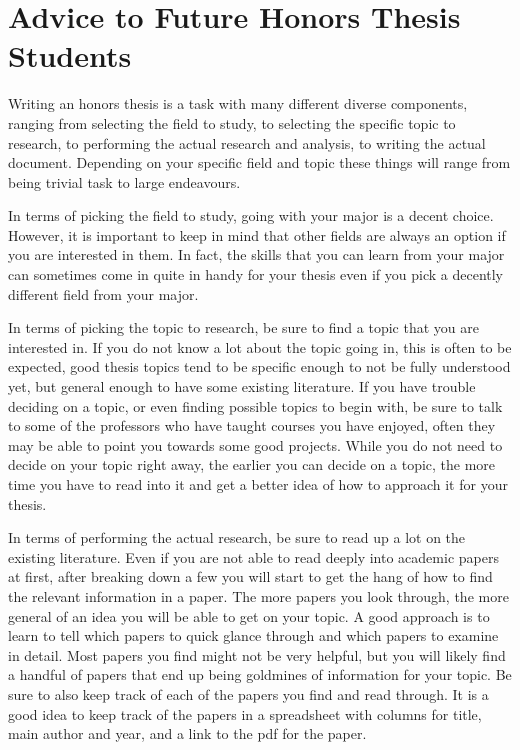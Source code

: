 \documentclass[]{article}
\begin{document}
\newpage

\doublespacing

\tableofcontents

\newpage


\section{Advice to Future Honors Thesis Students}

Writing an honors thesis is a task with many different diverse components, ranging from selecting the field to study, to selecting the specific topic to research, to performing the actual research and analysis, to writing the actual document. Depending on your specific field and topic these things will range from being trivial task to large endeavours.

In terms of picking the field to study, going with your major is a decent choice. However, it is important to keep in mind that other fields are always an option if you are interested in them. In fact, the skills that you can learn from your major can sometimes come in quite in handy for your thesis even if you pick a decently different field from your major.

In terms of picking the topic to research, be sure to find a topic that you are interested in. If you do not know a lot about the topic going in, this is often to be expected, good thesis topics tend to be specific enough to not be fully understood yet, but general enough to have some existing literature. If you have trouble deciding on a topic, or even finding possible topics to begin with, be sure to talk to some of the professors who have taught courses you have enjoyed, often they may be able to point you towards some good projects. While you do not need to decide on your topic right away, the earlier you can decide on a topic, the more time you have to read into it and get a better idea of how to approach it for your thesis.

In terms of performing the actual research, be sure to read up a lot on the existing literature. Even if you are not able to read deeply into academic papers at first, after breaking down a few you will start to get the hang of how to find the relevant information in a paper. The more papers you look through, the more general of an idea you will be able to get on your topic. A good approach is to learn to tell which papers to quick glance through and which papers to examine in detail. Most papers you find  might not be very helpful, but you will likely find a handful of papers that end up being goldmines of information for your topic. Be sure to also keep track of each of the papers you find and read through. It is a good idea to keep track of the papers in a spreadsheet with columns for title, main author and year, and a link to the pdf for the paper.
\end{document}
